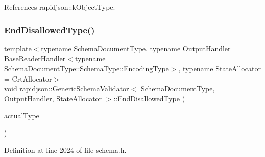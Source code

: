 References rapidjson\+::k\+Object\+Type.

\mbox{\label{classrapidjson_1_1_generic_schema_validator_aa87900ec83ae291f945ef182c1d76cbf}} 
\subsubsection{\texorpdfstring{EndDisallowedType()}{EndDisallowedType()}}
{\footnotesize\ttfamily template$<$typename Schema\+Document\+Type, typename Output\+Handler = Base\+Reader\+Handler$<$typename Schema\+Document\+Type\+::\+Schema\+Type\+::\+Encoding\+Type$>$, typename State\+Allocator = Crt\+Allocator$>$ \\
void \mbox{\hyperlink{classrapidjson_1_1_generic_schema_validator}{rapidjson\+::\+Generic\+Schema\+Validator}}$<$ Schema\+Document\+Type, Output\+Handler, State\+Allocator $>$\+::End\+Disallowed\+Type (\begin{DoxyParamCaption}\item[{const typename Schema\+Type\+::\+Value\+Type \&}]{actual\+Type }\end{DoxyParamCaption})}



Definition at line 2024 of file schema.\+h.


